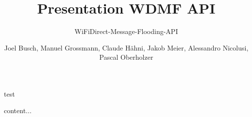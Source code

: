 \documentclass[11pt]{beamer}
\author{Joel Busch, Manuel Grossmann, Claude Hähni, Jakob Meier, Alessandro Nicolusi, Pascal Oberholzer}
\title{Presentation WDMF API}
\subtitle{WiFiDirect-Message-Flooding-API}
\institute{}
\date{}
\begin{document}
	\maketitle
	
	\begin{frame}
		\frametitle{}
		test
	\end{frame}
	
	\begin{frame}
		content...
	\end{frame}
	
\end{document}
